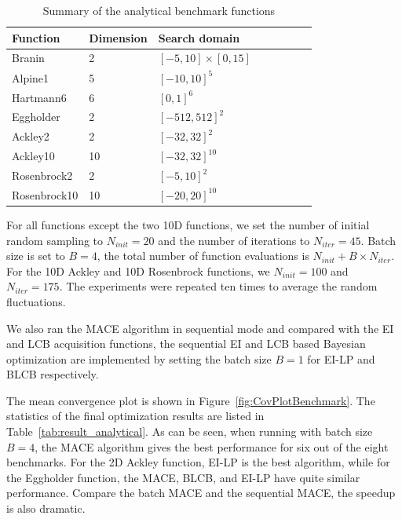 \begin{table}[htbp]
    \centering
    \caption{Summary of the analytical benchmark functions}
    \label{tab:summaryanalygical}
    \begin{tabular}{llllllll}
        \toprule
         Function           & Dimension        & Search domain             \\ \midrule
         Branin             & 2                & $[-5,  10]\times[0, 15]$  \\
         Alpine1            & 5                & $[-10, 10]^5$             \\
         Hartmann6          & 6                & $[0,   1]^6$              \\
         Eggholder          & 2                & $[-512, 512]^2$           \\
         Ackley2            & 2                & $[-32, 32]^2$             \\
         Ackley10           & 10               & $[-32, 32]^{10}$          \\
         Rosenbrock2        & 2                & $[-5,  10]^2$             \\
         Rosenbrock10       & 10               & $[-20, 20]^{10}$          \\
        \bottomrule
    \end{tabular}
\end{table}

For all functions except the two 10D functions, we set the number of initial
random sampling to $N_{init} = 20$ and the number of iterations to $N_{iter} =
45$. Batch size is set to $B = 4$, the total number of function evaluations is
$N_{init} + B \times N_{iter}$. For the 10D Ackley and 10D Rosenbrock functions, we
$N_{init} = 100$ and $N_{iter} = 175$. The experiments were repeated ten
times to average the random fluctuations. 

We also ran the MACE algorithm in sequential mode and compared with the EI and LCB
acquisition functions, the sequential EI and LCB based Bayesian optimization
are implemented by setting the batch size $B = 1$ for EI-LP and BLCB
respectively.

The mean convergence plot is shown in Figure~\ref{fig:CovPlotBenchmark}. The
statistics of the final optimization results are listed in
Table~\ref{tab:result_analytical}. As can be seen, when running with batch size
$B = 4$, the MACE algorithm gives the best performance for six out of the eight
benchmarks.  For the 2D Ackley function, EI-LP is the best algorithm, while for
the Eggholder function, the MACE, BLCB, and EI-LP have quite similar
performance.  Compare the batch MACE and the sequential MACE, the speedup is
also dramatic.


